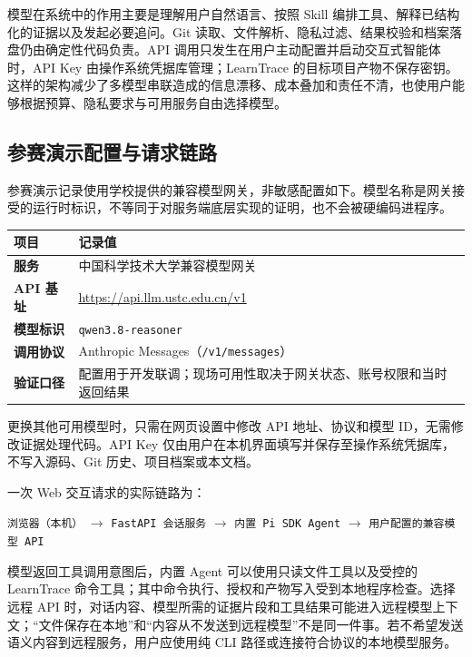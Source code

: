 \documentclass[UTF8,a4paper,12pt]{ctexart}
\begin{document}
模型在系统中的作用主要是理解用户自然语言、按照 Skill 编排工具、解释已结构化的证据以及发起必要追问。Git 读取、文件解析、隐私过滤、结果校验和档案落盘仍由确定性代码负责。API 调用只发生在用户主动配置并启动交互式智能体时，API Key 由操作系统凭据库管理；LearnTrace 的目标项目产物不保存密钥。这样的架构减少了多模型串联造成的信息漂移、成本叠加和责任不清，也使用户能够根据预算、隐私要求与可用服务自由选择模型。

\subsection{参赛演示配置与请求链路}

参赛演示记录使用学校提供的兼容模型网关，非敏感配置如下。模型名称是网关接受的运行时标识，不等同于对服务端底层实现的证明，也不会被硬编码进程序。

\begin{center}
\small
\begin{tabularx}{0.94\textwidth}{>{\bfseries}p{}X}
\toprule
项目 & 记录值 \\
\midrule
服务 & 中国科学技术大学兼容模型网关 \\
API 基址 & \url{https://api.llm.ustc.edu.cn/v1} \\
模型标识 & \texttt{qwen3.8-reasoner} \\
调用协议 & Anthropic Messages（\texttt{/v1/messages}） \\
验证口径 & 配置用于开发联调；现场可用性取决于网关状态、账号权限和当时返回结果 \\
\bottomrule
\end{tabularx}
\end{center}

更换其他可用模型时，只需在网页设置中修改 API 地址、协议和模型 ID，无需修改证据处理代码。API Key 仅由用户在本机界面填写并保存至操作系统凭据库，不写入源码、Git 历史、项目档案或本文档。

一次 Web 交互请求的实际链路为：

\begin{center}
\small
\texttt{浏览器（本机）}
$\rightarrow$
\texttt{FastAPI 会话服务}
$\rightarrow$
\texttt{内置 Pi SDK Agent}
$\rightarrow$
\texttt{用户配置的兼容模型 API}
\end{center}

模型返回工具调用意图后，内置 Agent 可以使用只读文件工具以及受控的 LearnTrace 命令工具；其中命令执行、授权和产物写入受到本地程序检查。选择远程 API 时，对话内容、模型所需的证据片段和工具结果可能进入远程模型上下文；“文件保存在本地”和“内容从不发送到远程模型”不是同一件事。若不希望发送语义内容到远程服务，用户应使用纯 CLI 路径或连接符合协议的本地模型服务。
\end{document}
